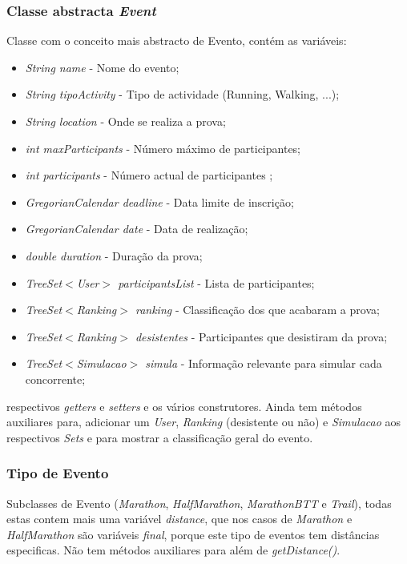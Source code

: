 \documentclass[12pt,notitlepage]{article}
\begin{document}
\subsubsection{Classe abstracta \textit{Event}}
Classe com o conceito mais abstracto de Evento, contém as variáveis:
\begin{itemize}
\item \textit{String name} - Nome do evento;
\item \textit{String tipoActivity} - Tipo de actividade (Running, Walking, ...);
\item \textit{String location} - Onde se realiza a prova;
\item \textit{int maxParticipants} - Número máximo de participantes;
\item \textit{int participants} - Número actual de participantes ;
\item \textit{GregorianCalendar deadline} - Data limite de inscrição;
\item \textit{GregorianCalendar date} - Data de realização;
\item \textit{double duration} - Duração da prova;
\item \textit{TreeSet$<$User$>$ participantsList} - Lista de participantes;
\item \textit{TreeSet$<$Ranking$>$ ranking} - Classificação dos que acabaram a prova;
\item \textit{TreeSet$<$Ranking$>$ desistentes} - Participantes que desistiram da prova;
\item \textit{TreeSet$<$Simulacao$>$ simula} - Informação relevante para simular cada concorrente;
\end{itemize}
respectivos \textit{getters} e \textit{setters} e os vários construtores. Ainda tem métodos auxiliares para, adicionar um \textit{User}, \textit{Ranking} (desistente ou não) e \textit{Simulacao} aos respectivos \textit{Sets} e para mostrar a classificação geral do evento.


\subsubsection{Tipo de Evento}

Subclasses de Evento (\textit{Marathon}, \textit{HalfMarathon}, \textit{MarathonBTT} e \textit{Trail}), todas estas contem mais uma variável \textit{distance}, que nos casos de \textit{Marathon} e \textit{HalfMarathon} são variáveis \textit{final}, porque este tipo de eventos tem distâncias especificas. Não tem métodos auxiliares para além de \textit{getDistance()}.
\end{document}
